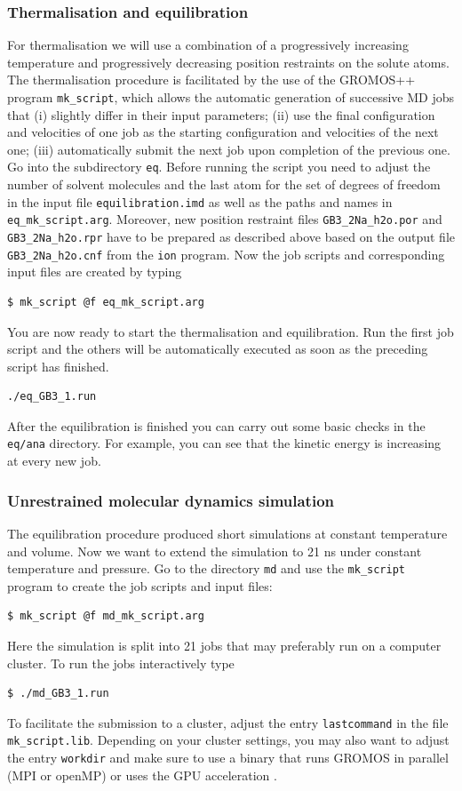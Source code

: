 \subsubsection{Thermalisation and equilibration}
For thermalisation we will use a combination of a progressively increasing temperature and progressively decreasing position restraints on the solute atoms. The thermalisation procedure is facilitated by the use of the GROMOS++ program \texttt{mk\_script}, which allows the automatic generation of successive MD jobs that (i) slightly differ in their input parameters; (ii) use the final configuration and velocities of one job as the starting configuration and velocities of the next one; (iii) automatically submit the next job upon completion of the previous one. Go into the subdirectory \texttt{eq}. Before running the script you need to adjust the number of solvent molecules and the last atom for the set of degrees of freedom in the input file \texttt{equilibration.imd} as well as the paths and names in \texttt{eq\_mk\_script.arg}. Moreover, new position restraint files \texttt{GB3\_2Na\_h2o.por} and \texttt{GB3\_2Na\_h2o.rpr} have to be prepared as described above based on the output file \texttt{GB3\_2Na\_h2o.cnf} from the \texttt{ion} program. Now the job scripts and corresponding input files are created by typing
\begin{lstlisting}
$ mk_script @f eq_mk_script.arg
\end{lstlisting}
You are now ready to start the thermalisation and equilibration. Run the first job script and the others will be automatically executed as soon as the preceding script has finished.
\begin{lstlisting}
./eq_GB3_1.run
\end{lstlisting}
After the equilibration is finished you can carry out some basic checks in the \texttt{eq/ana} directory. For example, you can see that the kinetic energy is increasing at every new job.

\subsubsection{Unrestrained molecular dynamics simulation}
The equilibration procedure produced short simulations at constant temperature and volume. Now we want to extend the simulation to 21 ns under constant temperature and pressure. Go to the directory \texttt{md} and use the \texttt{mk\_script} program to create the job scripts and input files:
\begin{lstlisting}
$ mk_script @f md_mk_script.arg
\end{lstlisting}
Here the simulation is split into 21 jobs that may preferably run on a computer cluster. To run the jobs interactively type
\begin{lstlisting}
$ ./md_GB3_1.run
\end{lstlisting}
To facilitate the submission to a cluster, adjust the entry \texttt{lastcommand} in the file \texttt{mk\_script.lib}. Depending on your cluster settings, you may also want to adjust the entry \texttt{workdir} and 
make sure to use a binary that runs GROMOS in parallel (MPI or openMP) or uses the GPU acceleration \cite{volume_8}.

